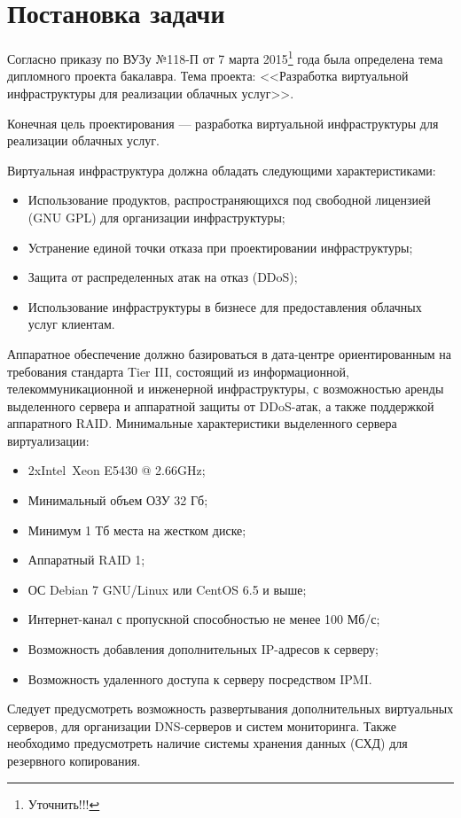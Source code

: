 \section{Постановка задачи}
Согласно приказу по ВУЗу №118-П от 7 марта 2015\footnote{Уточнить!!!} года была определена тема дипломного проекта бакалавра.
Тема проекта: <<Разработка виртуальной инфраструктуры для реализации облачных услуг>>.

Конечная цель проектирования --- разработка виртуальной инфраструктуры для реализации облачных услуг.

Виртуальная инфраструктура должна обладать следующими характеристиками:
\begin{itemize}
    \item Использование продуктов, распространяющихся под свободной лицензией (GNU GPL) для организации инфраструктуры;
    \item Устранение единой точки отказа при проектировании инфраструктуры;
    \item Защита от распределенных атак на отказ (DDoS);
    \item Использование инфраструктуры в бизнесе для предоставления облачных услуг клиентам.
\end{itemize}

Аппаратное обеспечение должно базироваться в дата-центре ориентированным на требования стандарта Tier III, состоящий из информационной, телекоммуникационной и инженерной инфраструктуры, с возможностью аренды выделенного сервера и аппаратной защиты от DDoS-атак, а также поддержкой аппаратного RAID.
Минимальные характеристики выделенного сервера виртуализации:
\begin{itemize}
    \item 2xIntel\textregistered~Xeon E5430 @ 2.66GHz;
    \item Минимальный объем ОЗУ 32 Гб;
    \item Минимум 1 Тб места на жестком диске;
    \item Аппаратный RAID 1;
    \item ОС Debian 7 GNU/Linux или CentOS 6.5 и выше;
    \item Интернет-канал с пропускной способностью не менее 100 Мб/с;
    \item Возможность добавления дополнительных IP-адресов к серверу;
    \item Возможность удаленного доступа к серверу посредством IPMI.
\end{itemize}

Следует предусмотреть возможность развертывания дополнительных виртуальных серверов, для организации DNS-серверов и систем мониторинга.
Также необходимо предусмотреть наличие системы хранения данных (СХД) для резервного копирования.

